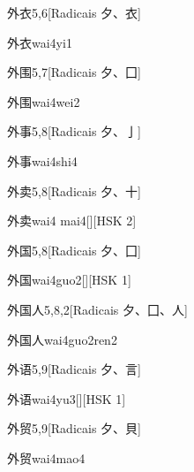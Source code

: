 \begin{entry}{外衣}{5,6}[Radicais ⼣、⾐]
  \begin{phonetics}{外衣}{wai4yi1}
  \end{phonetics}
\end{entry}

\begin{entry}{外围}{5,7}[Radicais ⼣、⼞]
  \begin{phonetics}{外围}{wai4wei2}
  \end{phonetics}
\end{entry}

\begin{entry}{外事}{5,8}[Radicais ⼣、⼅]
  \begin{phonetics}{外事}{wai4shi4}
  \end{phonetics}
\end{entry}

\begin{entry}{外卖}{5,8}[Radicais ⼣、⼗]
  \begin{phonetics}{外卖}{wai4 mai4}[][HSK 2]
  \end{phonetics}
\end{entry}

\begin{entry}{外国}{5,8}[Radicais ⼣、⼞]
  \begin{phonetics}{外国}{wai4guo2}[][HSK 1]
  \end{phonetics}
\end{entry}

\begin{entry}{外国人}{5,8,2}[Radicais ⼣、⼞、⼈]
  \begin{phonetics}{外国人}{wai4guo2ren2}
  \end{phonetics}
\end{entry}

\begin{entry}{外语}{5,9}[Radicais ⼣、⾔]
  \begin{phonetics}{外语}{wai4yu3}[][HSK 1]
  \end{phonetics}
\end{entry}

\begin{entry}{外贸}{5,9}[Radicais ⼣、⾙]
  \begin{phonetics}{外贸}{wai4mao4}
  \end{phonetics}
\end{entry}

